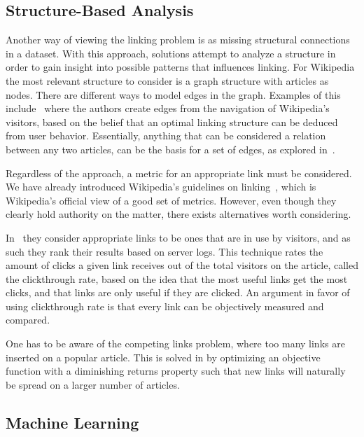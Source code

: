 \subsection{Structure-Based Analysis}\label{related_structural_analysis}
Another way of viewing the linking problem is as missing structural connections in a dataset. With this approach, solutions attempt to analyze a structure in order to gain insight into possible patterns that influences linking. For Wikipedia the most relevant structure to consider is a graph structure with articles as nodes. There are different ways to model edges in the graph. Examples of this include~\cite{hyperlink-structure-using-logs} where the authors create edges from the navigation of Wikipedia's visitors, based on the belief that an optimal linking structure can be deduced from user behavior. Essentially, anything that can be considered a relation between any two articles, can be the basis for a set of edges, as explored in~\cite{lu2011link}.

Regardless of the approach, a metric for an appropriate link must be considered. We have already introduced Wikipedia's guidelines on linking~\cite{wiki-editor-guidelines}, which is Wikipedia's official view of a good set of metrics. However, even though they clearly hold authority on the matter, there exists alternatives worth considering.

In~\cite{hyperlink-structure-using-logs} they consider appropriate links to be ones that are in use by visitors, and as such they rank their results based on server logs.  This technique rates the amount of clicks a given link receives out of the total visitors on the article, called the clickthrough rate, based on the idea that the most useful links get the most clicks, and that links are only useful if they are clicked. An argument in favor of using clickthrough rate is that every link can be objectively measured and compared.

One has to be aware of the competing links problem, where too many links are inserted on a popular article. This is solved in \cite{hyperlink-structure-using-logs} by optimizing an objective function with a diminishing returns property such that new links will naturally be spread on a larger number of articles.

\subsection{Machine Learning}\label{related_machine_learning}

